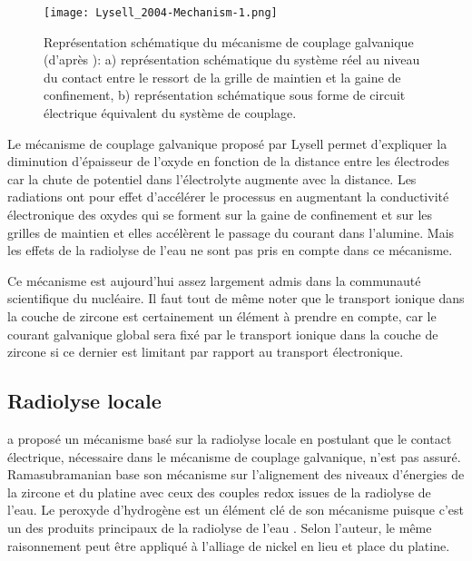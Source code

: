 \begin{refsection}
     \begin{figure}[H] 
            \centering 
            \texttt{[image: Lysell\_2004-Mechanism-1.png]}
            \caption[Représentation schématique du mécanisme couplage galvanique: 
            a) représentation schématique du système réel au niveau du contact entre
            le ressort de la grille de maintien et la gaine de confinement, 
            b) représentation schématique sous forme de circuit électrique équivalent du système de couplage.]
            {Représentation schématique du
                mécanisme de couplage galvanique (d'après \citet{Lysell2004}): 
            a) représentation schématique du système réel au niveau du contact entre
            le ressort de la grille de maintien et la gaine de confinement, 
            b) représentation schématique sous forme de circuit électrique équivalent du système de couplage.} 
            \label{fig:lysell_mechanism} 
 	\end{figure}


    Le mécanisme de couplage galvanique proposé par Lysell permet d’expliquer la diminution d’épaisseur de l’oxyde en
    fonction de la distance entre les électrodes car la chute de potentiel dans l’électrolyte augmente avec la distance.
    Les radiations ont pour effet d’accélérer le processus en augmentant la conductivité électronique
    des oxydes qui se forment sur la
    gaine de confinement et sur les grilles de maintien et elles accélèrent le passage du courant dans l'alumine. 
    Mais les effets de la radiolyse de l’eau ne sont pas pris en compte
    dans ce mécanisme.

    Ce mécanisme est aujourd'hui assez largement admis dans la communauté scientifique du nucléaire.
    Il faut tout de même noter que le transport ionique dans la couche de zircone est
    certainement un élément à prendre en compte, car le courant
    galvanique global sera fixé par le transport ionique dans la couche de zircone si ce dernier est limitant par rapport au
    transport électronique.


       
    \subsection{Radiolyse locale}\label{subsec:local_radiolysis}
    \citet{Ramasubramanian2004} a proposé un mécanisme basé sur la radiolyse locale en postulant que le contact
    électrique, nécessaire dans le mécanisme de couplage galvanique, n’est pas assuré. Ramasubramanian base son
    mécanisme sur l’alignement des niveaux d’énergies de la zircone et du platine avec ceux des couples redox issues de
    la radiolyse de l’eau. Le peroxyde d’hydrogène est un élément clé de son mécanisme puisque c’est un des produits
    principaux de la radiolyse de l’eau \citep{Saffre2011}. Selon l'auteur, le même raisonnement peut être appliqué à
    l'alliage de nickel en lieu et place du platine.


\end{refsection}
